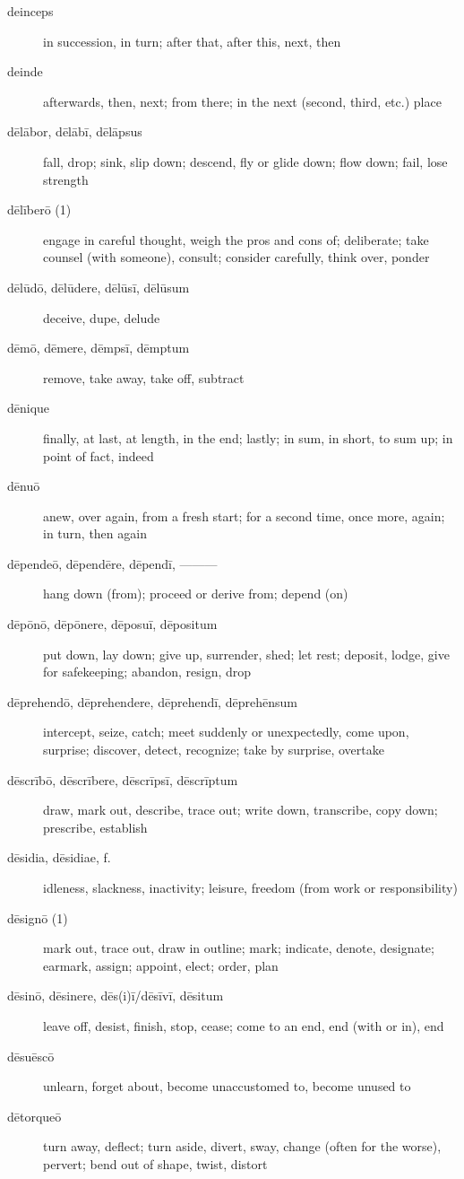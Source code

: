 \begin{description}
    \item[deinceps] in succession, in turn; after that, after this, next, then
    \item[deinde] afterwards, then, next; from there; in the next (second, third, etc.) place
    \item[dēlābor, dēlābī, dēlāpsus] fall, drop; sink, slip down; descend, fly or glide down; flow down; fail, lose strength
    \item[dēlīberō (1)] engage in careful thought, weigh the pros and cons of; deliberate; take counsel (with someone), consult; consider carefully, think over, ponder
    \item[dēlūdō, dēlūdere, dēlūsī, dēlūsum] deceive, dupe, delude
    \item[dēmō, dēmere, dēmpsī, dēmptum] remove, take away, take off, subtract
    \item[dēnique] finally, at last, at length, in the end; lastly; in sum, in short, to sum up; in point of fact, indeed
    \item[dēnuō] anew, over again, from a fresh start; for a second time, once more, again; in turn, then again
    \item[dēpendeō, dēpendēre, dēpendī, ———] hang down (from); proceed or derive from; depend (on)
    \item[dēpōnō, dēpōnere, dēposuī, dēpositum] put down, lay down; give up, surrender, shed; let rest; deposit, lodge, give for safekeeping; abandon, resign, drop
    \item[dēprehendō, dēprehendere, dēprehendī, dēprehēnsum] intercept, seize, catch; meet suddenly or unexpectedly, come upon, surprise; discover, detect, recognize; take by surprise, overtake
    \item[dēscrībō, dēscrībere, dēscrīpsī, dēscrīptum] draw, mark out, describe, trace out; write down, transcribe, copy down; prescribe, establish
    \item[dēsidia, dēsidiae, f.] idleness, slackness, inactivity; leisure, freedom (from work or responsibility)
    \item[dēsignō (1)] mark out, trace out, draw in outline; mark; indicate, denote, designate; earmark, assign; appoint, elect; order, plan
    \item[dēsinō, dēsinere, dēs(i)ī/dēsīvī, dēsitum] leave off, desist, finish, stop, cease; come to an end, end (with or in), end
    \item[dēsuēscō] unlearn, forget about, become unaccustomed to, become unused to
    \item[dētorqueō] turn away, deflect; turn aside, divert, sway, change (often for the worse), pervert; bend out of shape, twist, distort

\end{description}
